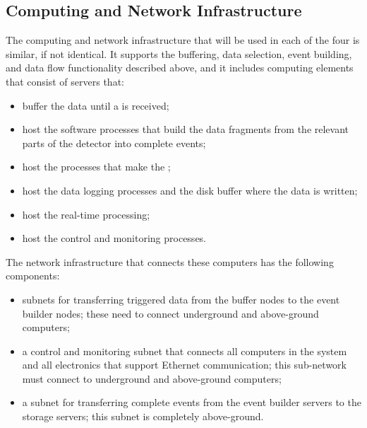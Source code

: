 
\subsection{Computing and Network Infrastructure}
\label{sec:fd-daq-infra}


The computing and network infrastructure that will be used in each
of the four  is similar, if not identical.
It supports the buffering, data selection, event
building, and data flow functionality described
above, and it includes computing elements that consist of servers that:

\begin{itemize}
\item buffer the data until a 
  is received;
\item host the software processes that
  build the data fragments from the relevant
  parts of the detector into complete events;
\item host the processes that make the
  ;
\item host the data logging processes and
  the disk buffer where the data is written;
\item host the real-time  processing;
\item host the control and monitoring processes.
\end{itemize}

The network infrastructure that connects these computers has the following components:

\begin{itemize}
\item subnets for transferring triggered data from the buffer
  nodes to the event builder nodes; these need to
  connect underground and above-ground computers;
\item a control and monitoring subnet that connects all
  computers in the  system and all 
  electronics that support Ethernet communication; this
  sub-network must connect to underground and
  above-ground computers;
\item a subnet for transferring complete events from the
  event builder servers to the storage servers; this subnet
  is completely above-ground.
\end{itemize}
